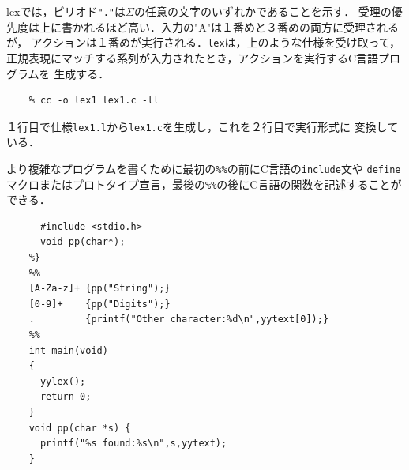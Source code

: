 \documentclass[a4j,dvipdfmx]{jbook}
\begin{document}
  lexでは，ピリオド\texttt{"."}は$\Sigma$の任意の文字のいずれかであることを示す．
  受理の優先度は上に書かれるほど高い．入力の"A"は１番めと３番めの両方に受理されるが，
  アクションは１番めが実行される．\texttt{lex}は，上のような仕様を受け取って，
  正規表現にマッチする系列が入力されたとき，アクションを実行するC言語プログラムを
  生成する．

  \begin{Verbatim}[frame=single]
    % lex -o lex1.c lex1.l
    % cc -o lex1 lex1.c -ll
  \end{Verbatim}


  １行目で仕様\texttt{lex1.l}から\texttt{lex1.c}を生成し，これを２行目で実行形式に
  変換している．

  より複雑なプログラムを書くために最初の\verb|%%|の前にC言語の\texttt{include}文や
  \texttt{define}マクロまたはプロトタイプ宣言，最後の\verb|%%|の後にC言語の関数を記述することができる．

  \begin{Verbatim}[frame=single]
    %{
      #include <stdio.h>
      void pp(char*);
    %}
    %%
    [A-Za-z]+ {pp("String");}
    [0-9]+    {pp("Digits");}
    .         {printf("Other character:%d\n",yytext[0]);}
    %%
    int main(void)
    {
      yylex();
      return 0;
    }
    void pp(char *s) {
      printf("%s found:%s\n",s,yytext);
    }
  \end{Verbatim}
\end{document}
